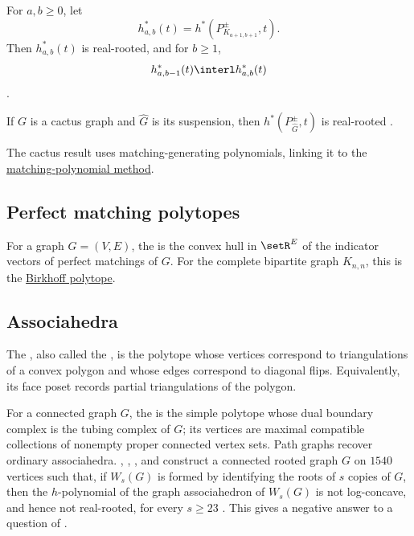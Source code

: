 \begin{theorem}
For $a,b\geq0$, let
\[
 h^*_{a,b}(t)=h^*(P_{K_{a+1,b+1}}^{\pm},t).
\]
Then $h^*_{a,b}(t)$ is real-rooted, and for $b\geq1$,
\[
 h^*_{a,b-1}(t)\interl h^*_{a,b}(t)
\]
\cite[Thm.~4.8]{HigashitaniJochemkoMichalek2019}.

If $G$ is a cactus graph and $\widehat G$ is its suspension, then
$h^*(P_{\widehat G}^{\pm},t)$ is real-rooted
\cite[Thm.~1.2]{OhsugiTsuchiya2021}.
\end{theorem}
The cactus result uses matching-generating polynomials, linking it to the
\hyperref[realRootedMatching]{matching-polynomial method}.


\subsection[perfectMatchingPolytope]{Perfect matching polytopes}

For a graph $G=(V,E)$, the
\label{perfectMatchingPolytopeDefinition}
is the convex hull
in $\setR^E$ of the indicator vectors of perfect matchings of $G$.  For the
complete bipartite graph $K_{n,n}$, this is the
\hyperref[birkhoffPolytope]{Birkhoff polytope}.


\subsection[associahedron]{Associahedra}

The \label{associahedronDefinition},
also called the \label{stasheffPolytope}, is the
polytope whose vertices correspond to triangulations of a convex polygon and
whose edges correspond to diagonal flips.  Equivalently, its face poset
records partial triangulations of the polygon.

For a connected graph $G$, the \label{graphAssociahedron} is the simple polytope whose dual
boundary complex is the tubing complex of $G$; its vertices are maximal
compatible collections of nonempty proper connected vertex sets.  Path graphs
recover ordinary associahedra.  ,
, , and 
construct a connected rooted graph $G$ on $1540$ vertices such that, if
$W_s(G)$ is formed by identifying the roots of $s$ copies of $G$, then the
$h$-polynomial of the graph associahedron of $W_s(G)$ is not log-concave, and
hence not real-rooted, for every $s\geq 23$
\cite[Thm.~E]{BercziCoronEurLi2026x}.  This gives a negative answer to a
question of .


